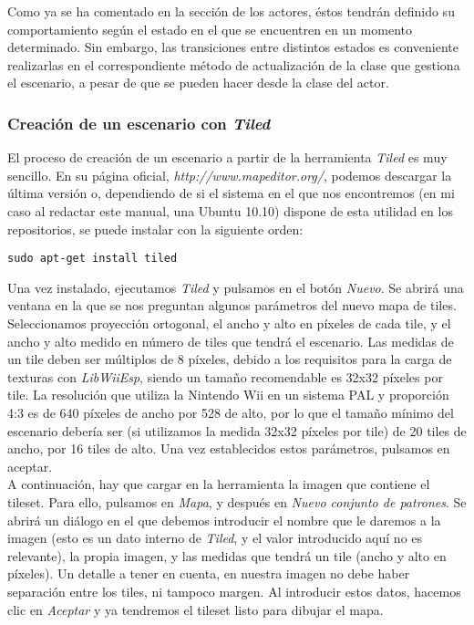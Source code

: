 Como ya se ha comentado en la sección de los actores, éstos tendrán definido su comportamiento según el estado en el que se encuentren en un momento determinado. Sin embargo, las transiciones entre distintos estados es conveniente realizarlas en el correspondiente método de actualización de la clase que gestiona el escenario, a pesar de que se pueden hacer desde la clase del actor.

\subsubsection{Creación de un escenario con \emph{Tiled}}

El proceso de creación de un escenario a partir de la herramienta \emph{Tiled} es muy sencillo. En su página oficial, \emph{http://www.mapeditor.org/}, podemos descargar la última versión o, dependiendo de si el sistema en el que nos encontremos (en mi caso al redactar este manual, una Ubuntu 10.10) dispone de esta utilidad en los repositorios, se puede instalar con la siguiente orden:

\begin{lstlisting}[style=consola]
sudo apt-get install tiled
\end{lstlisting}

Una vez instalado, ejecutamos \emph{Tiled} y pulsamos en el botón \emph{Nuevo}. Se abrirá una ventana en la que se nos preguntan algunos parámetros del nuevo mapa de tiles. Seleccionamos proyección ortogonal, el ancho y alto en píxeles de cada tile, y el ancho y alto medido en número de tiles que tendrá el escenario. Las medidas de un tile deben ser múltiplos de 8 píxeles, debido a los requisitos para la carga de texturas con \emph{LibWiiEsp}, siendo un tamaño recomendable es 32x32 píxeles por tile. La resolución que utiliza la Nintendo Wii en un sistema PAL y proporción 4:3 es de 640 píxeles de ancho por 528 de alto, por lo que el tamaño mínimo del escenario debería ser (si utilizamos la medida 32x32 píxeles por tile) de 20 tiles de ancho, por 16 tiles de alto. Una vez establecidos estos parámetros, pulsamos en aceptar.\\

A continuación, hay que cargar en la herramienta la imagen que contiene el tileset. Para ello, pulsamos en \emph{Mapa}, y después en \emph{Nuevo conjunto de patrones}. Se abrirá un diálogo en el que debemos introducir el nombre que le daremos a la imagen (esto es un dato interno de \emph{Tiled}, y el valor introducido aquí no es relevante), la propia imagen, y las medidas que tendrá un tile (ancho y alto en píxeles). Un detalle a tener en cuenta, en nuestra imagen no debe haber separación entre los tiles, ni tampoco margen. Al introducir estos datos, hacemos clic en \emph{Aceptar} y ya tendremos el tileset listo para dibujar el mapa.\\

